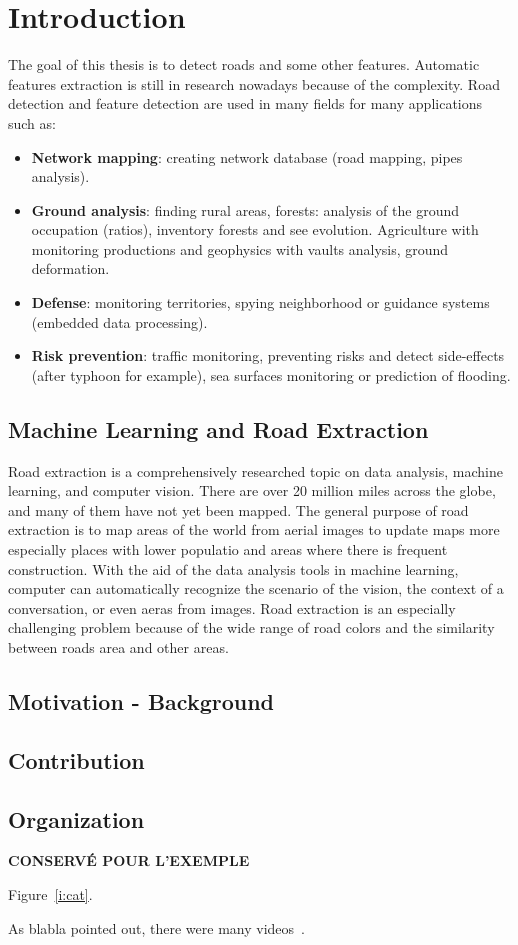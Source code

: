\chapter{Introduction}
\label{c:intro}

The goal of this thesis is to detect roads and some other features. Automatic features extraction is still in research nowadays because of the complexity.
Road detection and feature detection are used in many fields for many applications such as:
\begin{itemize}
	\item{\textbf{Network mapping}: creating network database (road mapping, pipes analysis).}
	\item{\textbf{Ground analysis}: finding rural areas, forests: analysis of the ground occupation (ratios), inventory forests and see evolution. Agriculture with monitoring productions and geophysics with vaults analysis, ground deformation.}
	\item{\textbf{Defense}: monitoring territories, spying neighborhood or guidance systems (embedded data processing).}
	\item{\textbf{Risk prevention}: traffic monitoring, preventing risks and detect side-effects (after typhoon for example), sea surfaces monitoring or prediction of flooding.}
\end{itemize}

\section{Machine Learning and Road Extraction}

Road extraction is a comprehensively researched topic on data analysis, machine learning, and computer vision. There are over 20 million miles across the globe, and many of them have not yet been mapped. The general purpose of road extraction is to map areas of the world from aerial images to update maps more especially places with lower populatio and areas where there is frequent construction. With the aid of the data analysis tools in machine learning, computer can automatically recognize the scenario of the vision, the context of a conversation, or even aeras from images. Road extraction is an especially challenging problem because of the wide range of road colors and the similarity between roads area and other areas.



\section{Motivation - Background}

\section{Contribution}

\section{Organization}

\textbf{CONSERV\'E POUR L'EXEMPLE}

Figure~\ref{i:cat}.


As blabla pointed out, there were many videos~.%
